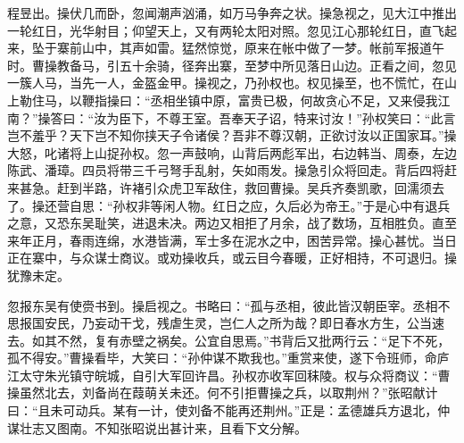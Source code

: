 程昱出。操伏几而卧，忽闻潮声汹涌，如万马争奔之状。操急视之，见大江中推出一轮红日，光华射目；仰望天上，又有两轮太阳对照。忽见江心那轮红日，直飞起来，坠于寨前山中，其声如雷。猛然惊觉，原来在帐中做了一梦。帐前军报道午时。曹操教备马，引五十余骑，径奔出寨，至梦中所见落日山边。正看之间，忽见一簇人马，当先一人，金盔金甲。操视之，乃孙权也。权见操至，也不慌忙，在山上勒住马，以鞭指操曰：“丞相坐镇中原，富贵已极，何故贪心不足，又来侵我江南？”操答曰：“汝为臣下，不尊王室。吾奉天子诏，特来讨汝！”孙权笑曰：“此言岂不羞乎？天下岂不知你挟天子令诸侯？吾非不尊汉朝，正欲讨汝以正国家耳。”操大怒，叱诸将上山捉孙权。忽一声鼓响，山背后两彪军出，右边韩当、周泰，左边陈武、潘璋。四员将带三千弓弩手乱射，矢如雨发。操急引众将回走。背后四将赶来甚急。赶到半路，许褚引众虎卫军敌住，救回曹操。吴兵齐奏凯歌，回濡须去了。操还营自思：“孙权非等闲人物。红日之应，久后必为帝王。”于是心中有退兵之意，又恐东吴耻笑，进退未决。两边又相拒了月余，战了数场，互相胜负。直至来年正月，春雨连绵，水港皆满，军士多在泥水之中，困苦异常。操心甚忧。当日正在寨中，与众谋士商议。或劝操收兵，或云目今春暖，正好相持，不可退归。操犹豫未定。

忽报东吴有使赍书到。操启视之。书略曰：“孤与丞相，彼此皆汉朝臣宰。丞相不思报国安民，乃妄动干戈，残虐生灵，岂仁人之所为哉？即日春水方生，公当速去。如其不然，复有赤壁之祸矣。公宜自思焉。”书背后又批两行云：“足下不死，孤不得安。”曹操看毕，大笑曰：“孙仲谋不欺我也。”重赏来使，遂下令班师，命庐江太守朱光镇守皖城，自引大军回许昌。孙权亦收军回秣陵。权与众将商议：“曹操虽然北去，刘备尚在葭萌关未还。何不引拒曹操之兵，以取荆州？”张昭献计曰：“且未可动兵。某有一计，使刘备不能再还荆州。”正是：孟德雄兵方退北，仲谋壮志又图南。不知张昭说出甚计来，且看下文分解。